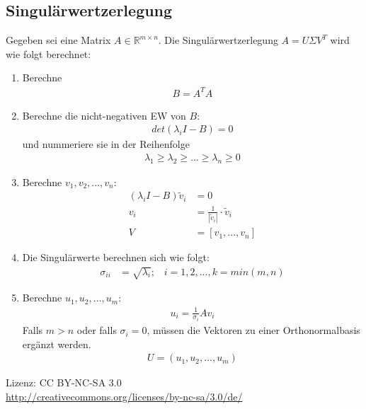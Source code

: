 \documentclass[a4paper,twocolumn,10pt]{article}
\begin{document}
\subsection{Singulärwertzerlegung}
Gegeben sei eine Matrix $A\in\mathbb{R}^{m\times n}$. Die Singulärwertzerlegung $A=U\Sigma V^T$ wird wie folgt berechnet:
\begin{enumerate}
\item Berechne
\begin{align*}
B=A^TA
\end{align*}
\item Berechne die nicht-negativen EW von $B$:
\begin{align*}
det(\lambda_iI-B)=0
\end{align*}
und nummeriere sie in der Reihenfolge
\begin{align*}
\lambda_1\geq\lambda_2\geq ...\geq\lambda_n\geq 0
\end{align*}
\item Berechne $v_1,v_2,...,v_n$:
\begin{align*}
(\lambda_iI-B)\tilde{v}_i&=0\\
v_i&=\frac{1}{|\tilde{v}_i|}\cdot\tilde{v}_i\\
V&=[v_1,...,v_n]
\end{align*}
\item Die Singulärwerte berechnen sich wie folgt:
\begin{align*}
\sigma_{ii}&=\sqrt{\lambda_i};\;\;\;i=1,2,...,k=min(m,n)
\end{align*}
\item Berechne $u_1,u_2,...,u_m$:
\begin{align*}
u_i=\frac{1}{\sigma_i}Av_i
\end{align*}
Falls $m>n$ oder falls $\sigma_i=0$, müssen die Vektoren zu einer Orthonormalbasis ergänzt werden.
\begin{align*}
U=(u_1,u_2,...,u_m)
\end{align*}
\end{enumerate}
\vspace{1cm}
Lizenz: CC BY-NC-SA 3.0\\
\url{http://creativecommons.org/licenses/by-nc-sa/3.0/de/}
\end{document}
